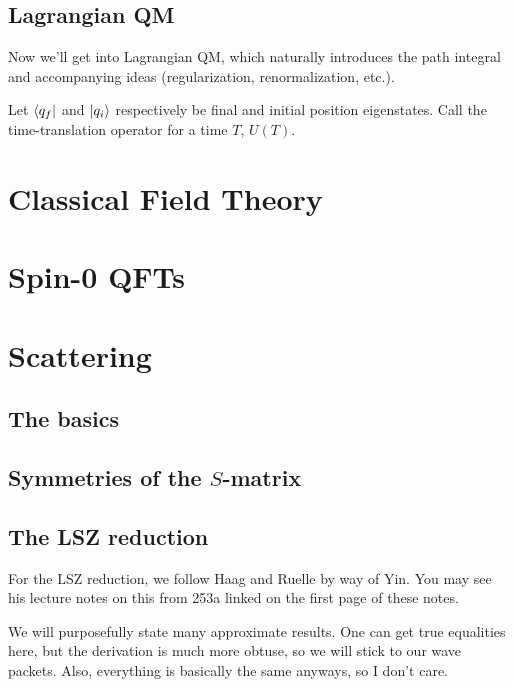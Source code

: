 \documentclass[11pt]{article}
\begin{document}
\subsection{Lagrangian QM}

Now we'll get into Lagrangian QM, which naturally introduces
the path integral and accompanying ideas (regularization, renormalization,
etc.).

\begin{iidea}
    Let $\langle q_f\rvert$ and $\lvert q_i\rangle$ respectively be final
    and initial position eigenstates. Call the time-translation
    operator for a time $T$, $U(T)$. 
\end{iidea}


\section{Classical Field Theory}

\section{Spin-0 QFTs}

\section{Scattering}

\subsection{The basics}

\subsection{Symmetries of the $S$-matrix}

\subsection{The LSZ reduction}

\begin{reemark}
    For the LSZ reduction, we follow Haag and Ruelle by way of Yin.
    You may see his lecture notes on this from 253a linked on the
    first page of these notes.

    We will purposefully state many approximate results. One can get true equalities
    here, but the derivation is much more obtuse, so we will stick to our wave
    packets. Also, everything is basically the same anyways, so I don't care.
\end{reemark}
\end{document}
